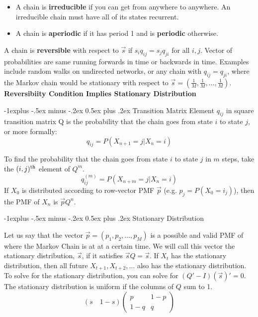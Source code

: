 \documentclass[10pt,landscape]{article}
\makeatletter
\theoremstyle{definition}
\renewcommand{\subsection}{\@startsection{subsection}{2}{0mm}%
                                {-1explus -.5ex minus -.2ex}%
                                {0.5ex plus .2ex}%
                                {\normalfont\normalsize\bfseries}}
\makeatother
\begin{document}
\begin{multicols}{3}
\begin{itemize}
\item A chain is \textbf{irreducible} if you can get from anywhere to anywhere. An irreducible chain must have all of its states recurrent. 
\item A chain is \textbf{aperiodic} if it has period 1 and is \textbf{periodic} otherwise. 
\end{itemize}
A chain is \textbf{reversible} with respect to $\vec{s}$ if $s_iq_{ij} = s_jq_{ji}$ for all $i, j$.  Vector of probabilities are same running forwards in time or backwards in time. Examples include random walks on undirected networks, or any chain with $q_{ij} = q_{ji}$, where the Markov chain would be stationary with respect to $\vec{s} = (\frac{1}{M}, \frac{1}{M}, \dots, \frac{1}{M})$. \\
\textbf{Reversibiity Condition Implies Stationary Distribution} 

\subsection{Transition Matrix}
Element $q_{ij}$ in square transition matrix Q is the probability that the chain goes from state $i$ to state $j$, or more formally:
\[q_{ij} = P(X_{n+1} = j | X_n = i)\]

To find the probability that the chain goes from state $i$ to state $j$ in $m$ steps, take the $(i, j)^\textnormal{th}$ element of $Q^m$.
\[q^{(m)}_{ij} = P(X_{n+m} = j | X_n = i)\]
If $X_0$ is distributed according to row-vector PMF $\vec{p}$ (e.g. $p_j = P(X_0 = i_j)$), then the PMF of $X_n$ is $\vec{p}Q^n$.


\subsection{Stationary Distribution}


Let us say that the vector $\vec{p} = (p_1, p_2, \dots, p_M)$ is a possible and valid PMF of where the Markov Chain is at at a certain time. We will call this vector the stationary distribution, $\vec{s}$, if it satisfies $\vec{s}Q = \vec{s}$. If $X_t$ has the stationary distribution, then all future $X_{t+1}, X_{t + 2}, \dots$ also has the stationary distribution. To solve for the stationary distribution, you can solve for $(Q' - I)(\vec{s})' = 0$. The stationary distribution is uniform if the columns of $Q$ sum to 1.
\[(s \quad 1-s)\left( \begin{array}{cc}
p & 1-p \\
1-q & q \end{array} \right)\] 



\end{multicols}
\end{document}
